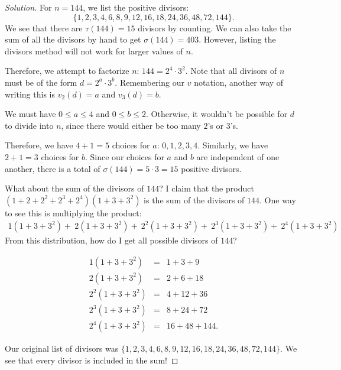 \begin{proof}[Solution]

For $n=144$, we list the positive divisors: $$\{1, 2, 3, 4, 6, 8, 9, 12, 16, 18, 24, 36, 48, 72, 144\}.$$ We see that there are $\tau(144)=15$ divisors by counting. We can also take the sum of all the divisors by hand to get $\sigma(144)=403$. However, listing the divisors method will not work for larger values of $n$. 

Therefore, we attempt to factorize $n$: $144=2^4\cdot 3^2$. Note that all divisors of $n$ must be of the form $d=2^{a}\cdot 3^{b}$. Remembering our $v$ notation, another way of writing this is $v_2(d)=a$ and $v_3(d)=b$.   

\color{ForestGreen} We must have $0\le a\le 4$ and $0\le b\le 2$. \color{black} Otherwise, it wouldn't be possible for $d$ to divide into $n$, since there would either be too many $2$'s or $3$'s.  

\clearpage

Therefore, we have $4+1=5$ choices for $a$: $0,1,2,3,4$. Similarly, we have $2+1=3$ choices for $b$. Since our choices for $a$ and $b$ are independent of one another, there is a total of $\sigma(144)=5\cdot 3=\boxed{15}$ positive divisors. 

What about the sum of the divisors of $144$? I claim that the product $(1+2+2^2+2^3+2^4)(1+3+3^2)$ is the sum of the divisors of $144$. One way to see this is multiplying the product: \color{red} \footnotesize \begin{eqnarray*}  1\left(1+3+3^2\right)+\:2\left(1+3+3^2\right)+\: 2^2\left(1+3+3^2\right)+\:2^3\left(1+3+3^2\right)+\:2^4\left(1+3+3^2\right) \end{eqnarray*} \normalsize\color{black} From this distribution, how do I get all possible divisors of $144$?  

\clearpage
\begin{eqnarray*} 1\left(1+3+3^2\right)&=& 1+3+9 \\ 2\left(1+3+3^2\right)&=& 2+6+18 \\ 2^2\left(1+3+3^2\right)&=&4+12+36 \\ 2^3\left(1+3+3^2\right)&=&8+24+72 \\ 2^4\left(1+3+3^2\right)&=&16+48+144. \end{eqnarray*}

Our original list of divisors was $\{1, 2, 3, 4, 6, 8, 9, 12, 16, 18, 24, 36, 48, 72, 144\}$. We see that every divisor is included in the sum! 

\clearpage


\end{proof}
